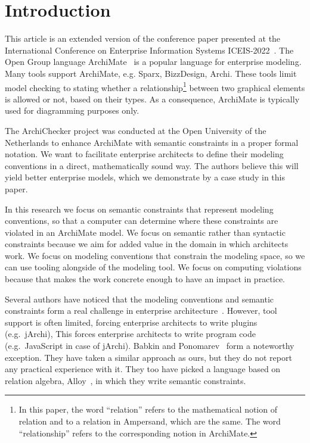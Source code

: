 \documentclass[sn-vancouver]{sn-jnl}%
\theoremstyle{thmstyleone}%
\theoremstyle{thmstyletwo}%
\theoremstyle{thmstylethree}%
\begin{document}
\maketitle

\section{Introduction}\label{sec1}
This article is an extended version of the conference paper presented at the International Conference on Enterprise Information Systems ICEIS-2022~\cite{iceis22}.
The Open Group language ArchiMate~\cite{ArchiMate} is a popular language for enterprise modeling.
Many tools support ArchiMate, e.g. Sparx, BizzDesign, Archi.
These tools limit model checking to stating whether a relationship\footnote{In this paper, the word ``relation'' refers to the mathematical notion of relation and to a relation in Ampersand, which are the same.
The word ``relationship'' refers to the corresponding notion in ArchiMate.} between two graphical elements is allowed or not, based on their types.
As a consequence, ArchiMate is typically used for diagramming purposes only.

The ArchiChecker project was conducted at the Open University of the Netherlands to enhance ArchiMate with semantic constraints in a proper formal notation.
We want to facilitate enterprise architects to define their modeling conventions in a direct, mathematically sound way.
The authors believe this will yield better enterprise models, which we demonstrate by a case study in this paper.

In this research we focus on semantic constraints that represent modeling conventions,
so that a computer can determine where these constraints are violated in an ArchiMate model.
We focus on semantic rather than syntactic constraints because we aim for added value in the domain in which architects work.
We focus on modeling conventions that constrain the modeling space, so we can use tooling alongside of the modeling tool.
We focus on computing violations because that makes the work concrete enough to have an impact in practice.

Several authors have noticed that the modeling conventions and semantic constraints
form a real challenge in enterprise architecture~\cite{kharlamov2016capturing,chatzikonstantinou2012policy,ramos2014automated,bider2020structural}.
However, tool support is often limited, forcing enterprise architects to write plugins (e.g.~jArchi),
This forces enterprise architects to write program code (e.g.~JavaScript in case of jArchi).
Babkin and Ponomarev~\cite{babkin2017analysis} form a noteworthy exception.
They have taken a similar approach as ours, but they do not report any practical experience with it.
They too have picked a language based on relation algebra, Alloy~\cite{Alloy2006}, in which they write semantic constraints.
\end{document}
